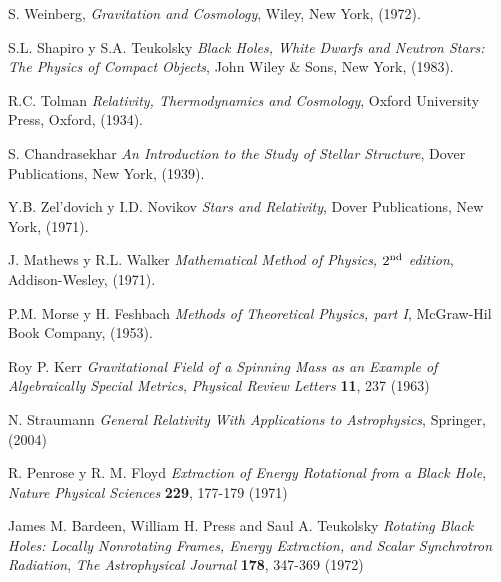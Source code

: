\begin{thebibliography}{99}
 S. Weinberg, {\em Gravitation and Cosmology}, Wiley, New
York, (1972).

 S.L. Shapiro y S.A. Teukolsky {\em Black Holes, White Dwarfs and Neutron Stars: The Physics of Compact Objects}, John Wiley \& Sons, New York, (1983).

 R.C. Tolman {\em Relativity, Thermodynamics and Cosmology}, Oxford University Press, Oxford, (1934).

 S. Chandrasekhar {\em An Introduction to the Study of Stellar Structure}, Dover Publications, New York, (1939).


 Y.B. Zel'dovich y I.D. Novikov {\em Stars and Relativity}, Dover Publications, New York, (1971).

 J. Mathews y R.L. Walker {\em Mathematical Method of Physics, $2^{\rm nd}$ edition}, Addison-Wesley, (1971).

 P.M. Morse y H. Feshbach {\em Methods of Theoretical Physics, part I}, McGraw-Hil Book Company,  (1953).

 Roy P. Kerr {\em Gravitational Field of a Spinning Mass as an Example of Algebraically Special Metrics}, {\sl Physical Review Letters } {\bf 11}, 237 (1963)

 N. Straumann {\em General Relativity With Applications to Astrophysics}, Springer, (2004)

 R. Penrose y R. M. Floyd {\em Extraction of Energy Rotational from a Black Hole}, {\sl Nature Physical Sciences} {\bf 229}, 177-179 (1971)

 James M. Bardeen, William H. Press and Saul A. Teukolsky {\em Rotating Black Holes: Locally Nonrotating Frames, Energy Extraction, and Scalar Synchrotron Radiation}, {\sl The Astrophysical Journal} {\bf 178}, 347-369 (1972)
\end{thebibliography}
